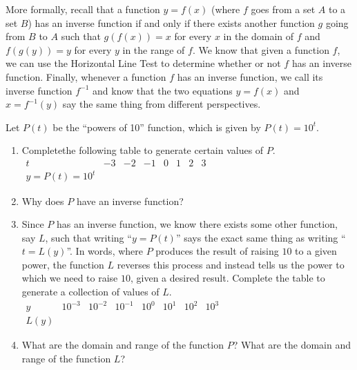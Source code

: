 \documentclass[nooutcomes]{ximera}
\begin{document}
More formally, recall that a function \(y = f(x)\) (where $f$ goes from a set $A$ to a set $B$) has an inverse function if and only if there exists another function $g$ going from $B$ to $A$ such that \(g(f(x)) = x\) for every \(x\) in the domain of \(f\) and \(f(g(y)) = y\) for every $y$ in the range of $f$. We know that given a function \(f\), we can use the Horizontal Line Test to determine whether or not \(f\) has an inverse function.  Finally, whenever a function \(f\) has an inverse function, we call its inverse function \(f^{-1}\) and know that the two equations \(y = f(x)\) and \(x = f^{-1}(y)\) say the same thing from different perspectives.%
\begin{exploration}

Let \(P(t)\) be the ``powers of 10'' function, which is given by \(P(t) = 10^t\).%

\begin{enumerate}[label=\alph*.]
\item
Completethe following table to generate certain values of \(P\).%
\\
$
\begin{array}{llllllll}
t&-3&-2&-1&0&1&2&3\\
\hline
y = P(t) = 10^t&~&~&~&~&~&~&
\end{array}
$
\item
Why does \(P\) have an inverse function?%
\item
Since \(P\) has an inverse function, we know there exists some other function, say \(L\), such that writing ``\(y = P(t)\)'' says the exact same thing as writing ``\(t = L(y)\)''.  In words, where \(P\) produces the result of raising \(10\) to a given power, the function \(L\) reverses this process and instead tells us the power to which we need to raise \(10\), given a desired result.  Complete the table to generate a collection of values of \(L\).%
\\
$
\begin{array}{llllllll}
y&10^{-3}&10^{-2}&10^{-1}&10^{0}&10^{1}&10^{2}&10^{3}\\
\hline
L(y)&~&~&~&~&~&~&
\end{array}
$
\item
What are the domain and range of the function \(P\)?  What are the domain and range of the function \(L\)?%
\end{enumerate}
%
\end{exploration}


%
%
%
\end{document}
